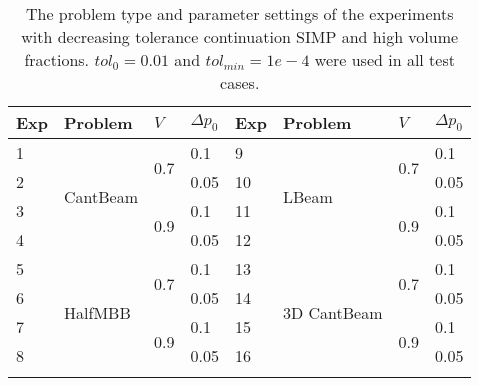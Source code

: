 \begin{table}[H]
\centering
\tabcolsep=0.09cm
\caption{The problem type and parameter settings of the experiments with decreasing tolerance continuation SIMP and high volume fractions. $tol_0 = 0.01$ and $tol_{min} = 1e-4$ were used in all test cases.}
\label{tab:exp_params3}
\begin{tabular}{|l|l|l|l||l|l|l|l|}
\hline\noalign{\smallskip}
Exp & Problem & $V$ & $\Delta p_0$ & Exp & Problem & $V$ & $\Delta p_0$ \\
\hline
1 & \multirow{ 4 }{*}{CantBeam} & \multirow{ 2 }{*}{0.7} & 0.1 & 9 & \multirow{ 4 }{*}{LBeam} & \multirow{ 2 }{*}{0.7} & 0.1 \\
2 & & & 0.05 & 10 & & & 0.05 \\
3 & & \multirow{ 2 }{*}{0.9} & 0.1 & 11 & & \multirow{ 2 }{*}{0.9} & 0.1 \\
4 & & & 0.05 & 12 & & & 0.05 \\
\hline
5 & \multirow{ 4 }{*}{HalfMBB} & \multirow{ 2 }{*}{0.7} & 0.1 & 13 & \multirow{ 4 }{*}{3D CantBeam} & \multirow{ 2 }{*}{0.7} & 0.1 \\
6 & & & 0.05 & 14 & & & 0.05 \\
7 & & \multirow{ 2 }{*}{0.9} & 0.1 & 15 & & \multirow{ 2 }{*}{0.9} & 0.1 \\
8 & & & 0.05 & 16 & & & 0.05 \\
\noalign{\smallskip}\hline
\end{tabular}
\end{table}
